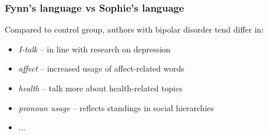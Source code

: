 \begin{frame}
  \frametitle{Fynn's language vs Sophie's language}
  Compared to control group, authors with bipolar disorder tend differ in:
  \begin{itemize}
    \item \emph{I-talk} -- in line with research on depression
    \item \emph{affect} -- increased usage of affect-related words
    \item \emph{health} -- talk more about health-related topics
    \item \emph{pronoun usage} -- reflects standings in social hierarchies
    \item ...
  \end{itemize}
\end{frame}

